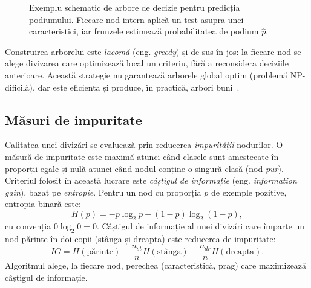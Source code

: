 \documentclass[12pt,a4paper]{report}
\begin{document}
\begin{figure}[htbp]
  \centering
  \caption{Exemplu schematic de arbore de decizie pentru predicția podiumului. Fiecare nod
    intern aplică un test asupra unei caracteristici, iar frunzele estimează probabilitatea de
    podium $\hat{p}$.}
  \label{fig:arbore}
\end{figure}

Construirea arborelui este \emph{lacomă} (eng. \emph{greedy}) și de sus în jos: la fiecare nod
se alege divizarea care optimizează local un criteriu, fără a reconsidera deciziile anterioare.
Această strategie nu garantează arborele global optim (problemă NP-dificilă), dar este eficientă
și produce, în practică, arbori buni~\cite{hastie2009elements}.

\subsection{Măsuri de impuritate}

Calitatea unei divizări se evaluează prin reducerea \emph{impurității} nodurilor. O măsură de
impuritate este maximă atunci când clasele sunt amestecate în proporții egale și nulă atunci când
nodul conține o singură clasă (nod \emph{pur}). Criteriul folosit în această lucrare este
\emph{câștigul de informație} (eng. \emph{information gain}), bazat pe \emph{entropie}. Pentru un
nod cu proporția $p$ de exemple pozitive, entropia binară este:
\begin{equation}
  H(p) = -p \log_2 p - (1 - p) \log_2 (1 - p),
  \label{eq:entropie}
\end{equation}
cu convenția $0 \log_2 0 = 0$. Câștigul de informație al unei divizări care împarte un nod
părinte în doi copii (stânga și dreapta) este reducerea de impuritate:
\begin{equation}
  IG = H(\text{părinte}) - \frac{n_{st}}{n} H(\text{stânga}) - \frac{n_{dr}}{n} H(\text{dreapta}).
  \label{eq:gain}
\end{equation}
Algoritmul alege, la fiecare nod, perechea (caracteristică, prag) care maximizează câștigul de
informație.
\end{document}

